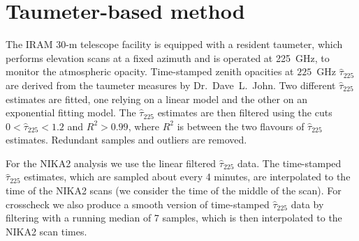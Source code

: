 \section{Taumeter-based method}%
\label{se:taumeter-method}

The IRAM 30-m telescope facility is equipped with a resident taumeter, which performs
elevation scans at a fixed azimuth and is operated at 225~GHz, to
monitor the atmospheric opacity.
Time-stamped zenith opacities at $225$~GHz $\hat{\tau}_{225}$ are derived from the
taumeter measures by Dr.~Dave~L.~John. Two different $\hat{\tau}_{225}$
estimates are fitted, one relying on a linear model and the other on
an exponential fitting model. The $\hat{\tau}_{225}$ estimates are then
filtered using the cuts $0< \hat{\tau}_{225} <1.2$ and $R^2 > 0.99$, where
$R^2$ is  between the two flavours of
$\hat{\tau}_{225}$ estimates. Redundant samples and outliers are removed.

For the NIKA2 analysis we use the linear filtered  $\hat{\tau}_{225}$ data.
The time-stamped $\hat{\tau}_{225}$ estimates, which are sampled about
every 4 minutes, are interpolated to the time of the NIKA2 scans (we
consider the time of the middle of the scan). For crosscheck we also
produce a smooth version of time-stamped $\hat{\tau}_{225}$ data by
filtering with a running median of 7 samples, which is then
interpolated to the NIKA2 scan times.


